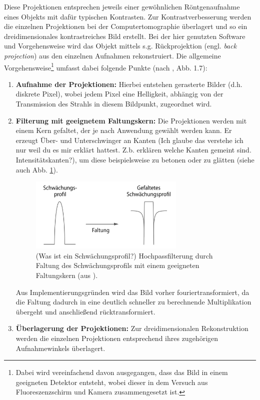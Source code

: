 \documentclass[11pt, a4paper]{article}
\numberwithin{equation}{section}
\newcommand{\korr}[1]{{\color{red}(#1)}}
\begin{document}
Diese Projektionen entsprechen jeweils einer gewöhnlichen Röntgenaufnahme eines Objekts mit dafür typischen Kontrasten.
Zur Kontrastverbesserung werden die einzelnen Projektionen bei der Computertomographie überlagert und so ein dreidimensionales kontrastreiches Bild erstellt.
Bei der hier genutzten Software und Vorgehensweise wird das Objekt mittels s.g. Rückprojektion (engl. \emph{back projection}) aus den einzelnen Aufnahmen rekonstruiert.
Die allgemeine Vorgehensweise\footnote{Dabei wird vereinfachend davon ausgegangen, dass das Bild in einem geeigneten Detektor entsteht, wobei dieser in dem Versuch aus Fluoreszenzschirm und Kamera zusammengesetzt ist.} umfasst dabei folgende Punkte (nach \cite{kalender}, Abb. 1.7):
\begin{enumerate}
	\item \textbf{Aufnahme der Projektionen:} Hierbei entstehen gerasterte Bilder (d.h. diskrete Pixel), wobei jedem Pixel eine Helligkeit, abhängig von der Transmission des Strahls in diesem Bildpunkt, zugeordnet wird.
	\item \textbf{Filterung mit geeignetem Faltungskern:} Die Projektionen werden mit einem Kern gefaltet, der je nach Anwendung gewählt werden kann.
	Er erzeugt Über- und Unterschwinger an Kanten \korr{Ich glaube das verstehe ich nur weil du es mir erklärt hattest. Z.b. erklären welche Kanten gemeint sind. Intensitätskanten?}, um diese beispielsweise zu betonen oder zu glätten (siehe auch Abb. \ref{fig:ct_faltung}).
	\begin{figure}[ht]
		\centering
		\includegraphics[width=0.7\textwidth]{./figures/ct/faltung.jpg}
		\caption{\korr{Was ist ein Schwächungsprofil?} Hochpassfilterung durch Faltung des Schwächungsprofils mit einem geeigneten Faltungskern (aus \cite{alkadhi}).}
		\label{fig:ct_faltung}
	\end{figure}
	Aus Implementierungsgründen wird das Bild vorher fouriertransformiert, da die Faltung dadurch in eine deutlich schneller zu berechnende Multiplikation übergeht und anschließend rücktransformiert.
	\item \textbf{Überlagerung der Projektionen:} Zur dreidimensionalen Rekonstruktion werden die einzelnen Projektionen entsprechend ihres zugehörigen Aufnahmewinkels überlagert.

\end{enumerate}
\end{document}
